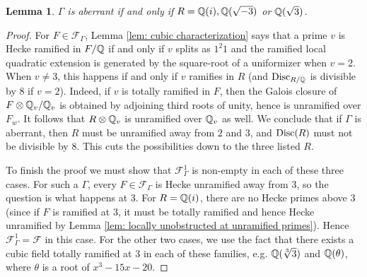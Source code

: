 \documentclass[11pt,a4paper]{amsart}
\def\Q{{\rm \mathbb{Q}}}
\def\Disc{{\rm Disc}}
\numberwithin{equation}{section}
\newtheorem{lemma}[theorem]{Lemma}
\begin{document}
\begin{lemma}
    $\Gamma$ is aberrant if and only if $R = \Q(i),\Q(\sqrt{-3})$ or $\Q(\sqrt{3})$.
\end{lemma}
\begin{proof}
    For $F \in \mathcal{F}_\Gamma$, Lemma \ref{lem: cubic characterization} says that a prime $v$ is Hecke ramified in $F/\Q$ if and only if $v$ splits as $1^2 1$ and the ramified local quadratic extension is generated by the square-root of a uniformizer when $v = 2$. When $v \neq 3$, this happens if and only if $v$ ramifies in $R$ (and $\Disc_{R/\Q}$ is divisible by $8$ if $v = 2$). Indeed, if $v$ is totally ramified in $F$, then the Galois closure of $F \otimes \Q_v/\Q_v$ is obtained by adjoining third roots of unity, hence is unramified over $F_w$. It follows that $R \otimes \Q_v$ is unramified over $\Q_v$ as well.  We conclude that if $\Gamma$ is aberrant, then $R$ must be unramified away from $2$ and $3$, and $\Disc(R)$ must not be divisible by $8$. This cuts the possibilities down to the three listed $R$. 
    
    To finish the proof we must show that  $\mathcal{F}_\Gamma^1$ is non-empty in each of these three cases. For such a $\Gamma$, every $F \in \mathcal{F}_\Gamma$ is Hecke unramified away from $3$, so the question is what happens at $3$. For $R = \Q(i)$, there are no Hecke primes above $3$ (since if $F$ is ramified at $3$, it must be totally ramified and hence Hecke unramified by Lemma \ref{lem: locally unobstructed at unramified primes}).  Hence $\mathcal{F}_\Gamma^1 = \mathcal{F}$ in this case. For the other two cases, we use the fact that there exists a cubic field totally ramified at $3$ in each of these families, e.g. $\Q(\sqrt[3]{3})$ and $\Q(\theta)$, where $\theta$ is a root of $x^3 - 15x - 20$. 
\end{proof}
\end{document}
